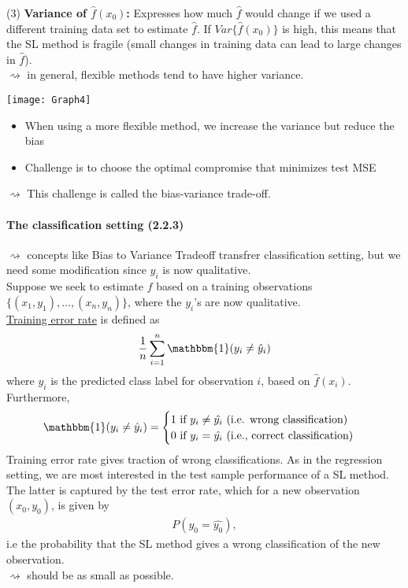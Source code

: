 \documentclass[11pt,a4paper,numbers=endperiod]{scrartcl}
\begin{document}
(3) \textbf{Variance of $\hat{f}(x_0)$:} Expresses how much $\hat{f}$ would change if we used a different training data set to estimate $\hat{f}$. If $Var \{\hat{f}(x_0)\}$ is high, this means that the SL method is fragile (small changes in training data can lead to large changes in $\hat{f}$).\\
$\rightsquigarrow$ in general, flexible methods tend to have higher variance. \\
\begin{center}
	\texttt{[image: Graph4]}
\end{center}

\begin{itemize}[label={--}]
	\item When using a more flexible method, we increase the variance but reduce the bias
	\item Challenge is to choose the optimal compromise that minimizes test MSE
\end{itemize}
$\rightsquigarrow$ This challenge is called the bias-variance trade-off. 

\paragraph{The classification setting (2.2.3)}
$ $\\

$\rightsquigarrow$ concepts like Bias to Variance Tradeoff transfrer classification setting, but we need some modification since $y_i$ is now qualitative.\\

Suppose we seek to estimate $f$ based on a training observations $\{(x_1, y_1), \ldots, (x_n, y_n)\}$, where the $y_i$'s are now qualitative.\\
\underline{Training error rate} is defined as 
\begin{align*}
	\frac{1}{n} \sum\limits_{i =1}^n \mathbbm{1}(y_i \neq \hat{y}_i)
\end{align*}
where $\hat{y_i}$ is the predicted class label for observation $i$, based on $\hat{f}(x_i)$. Furthermore, 
\begin{align*}
	\mathbbm{1}(y_i \neq \hat{y}_i) = \begin{cases}
		1 \text{ if } y_i \neq \hat{y_i} \text{  (i.e. wrong classification)}\\
		0 \text{ if } y_i = \hat{y_i} \text{ (i.e., correct classification)}
		\end{cases}
\end{align*}
Training error rate gives traction of wrong classifications. As in the regression setting, we are most interested in the test sample performance of a SL method. The latter is captured by the test error rate, which for a new observation $(x_0, y_0)$, is given by
\begin{align*}
	P(y_0 = \hat{y_0}), 
\end{align*}
i.e the probability that the SL method gives a wrong classification of the new observation.\\ $\rightsquigarrow$ should be as small as possible. 
\newpage
\end{document}
